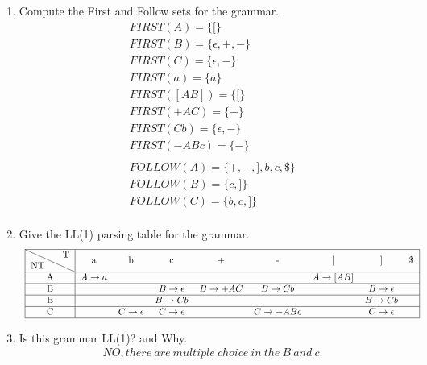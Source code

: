 \documentclass[10pt]{article}
\begin{document}
\begin{enumerate}
\begin{enumerate}
  \item Compute the First and Follow sets for the grammar.
             \[\begin{array}{cll}
              FIRST(A)=\{[\} \\
              FIRST(B)=\{\epsilon,+,-\} \\
              FIRST(C)=\{\epsilon,-\} \\
              FIRST(a)=\{a\} \\
              FIRST([AB])=\{[\} \\
              FIRST(+AC)=\{+\} \\
              FIRST(Cb)=\{\epsilon,-\} \\
              FIRST(-ABc)=\{-\} \\ \\
              FOLLOW(A)=\{+,-,],b,c,\$\} \\
              FOLLOW(B)=\{c,]\} \\
              FOLLOW(C)=\{b,c,]\} \\
            \end{array}\]
  \item Give the LL(1) parsing table for the grammar.
             \[\begin{array}{cll}
                 \begin{tabular}{|c|*{8}{c}|}
                        \hline
                        \diagbox{NT}{T} & a & b & c & + & - & [ & ] & \$ \\
                        \hline
                                      A & $A \rightarrow a$ &  &  &  & & $A \rightarrow [AB]$ & & \\
                        \hline
                                      B &  &  & $B \rightarrow \epsilon$ & $B \rightarrow +AC$ & $B \rightarrow Cb$ & & $B \rightarrow \epsilon$ & \\
                        \hline
                                      B &  &  & $B \rightarrow Cb$ &  &  &  & $B \rightarrow Cb$ & \\
                        \hline
                                      C &  & $C \rightarrow \epsilon$ & $C \rightarrow \epsilon$ &  & $C \rightarrow -ABc$ & & $C \rightarrow \epsilon$ & \\
                        \hline
                  \end{tabular}
            \end{array}\]
  \item Is this grammar LL(1)? and Why.
              \[\begin{array}{cll}
            NO,there \  are \  multiple \ choice \ in \  the \ B \  and \  c.
            \end{array}\]
\end{enumerate}


\end{enumerate}
\end{document}
